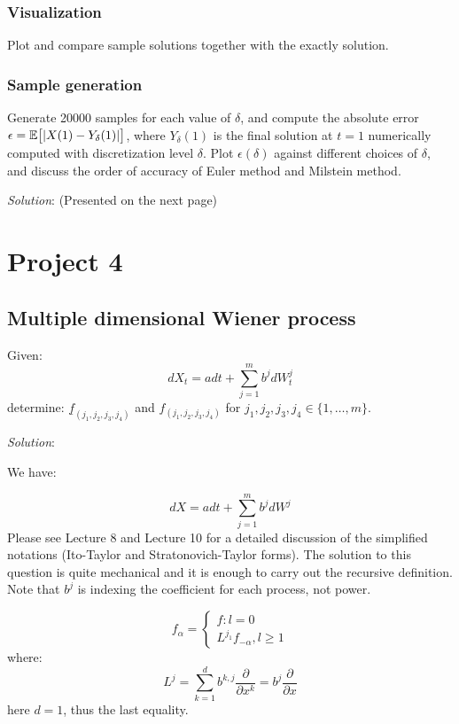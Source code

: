 \documentclass{article}
\begin{document}
\subsubsection{Visualization} Plot and compare sample solutions together with the exactly  solution.

\subsubsection{Sample generation} Generate 20000 samples for each value of $\delta$, and compute the absolute error $\epsilon = \mathbb{E}\big[ {\abs{X(1)-Y_{\delta}(1)}} \big]$, where $Y_{\delta}(1)$ is the final solution at $t=1$ numerically computed with discretization level $\delta$. Plot $\epsilon(\delta)$ against different choices of $\delta$, and discuss the order of accuracy of Euler method and Milstein method.

\emph{Solution}: (Presented on the next page)




\section{Project 4}
\subsection{Multiple dimensional Wiener process} Given:
$$
    dX_t = adt + \sum_{j=1}^mb^jdW_t^j
$$ determine:
$
    \underline{f}_{(j_1,j_2,j_3,j_4)}
$ and $ f_{(j_1,j_2,j_3,j_4)}$ for $j_1,j_2,j_3,j_4\in\{1,\ldots,m\}$.

\emph{Solution}: 

We have:

$$
    dX = adt + \sum_{j=1}^mb^jdW^j
$$ Please see Lecture 8 and Lecture 10 for a detailed discussion of the simplified notations (Ito-Taylor and Stratonovich-Taylor forms). The solution to this question is quite mechanical and it is enough to carry out the recursive definition. Note that $b^j$ is indexing the coefficient for each process, not power.

$$
    f_{\alpha} = 
    \begin{cases}
        f: l=0\\
        L^{j_1}f_{-\alpha}, l\ge 1
    \end{cases}
$$ where:
$$
    L^j = \sum_{k=1}^db^{k,j}\frac{\partial}{\partial x^k} = b^j\frac{\partial}{\partial x}
$$ here $d=1$, thus the last equality.
\end{document}
